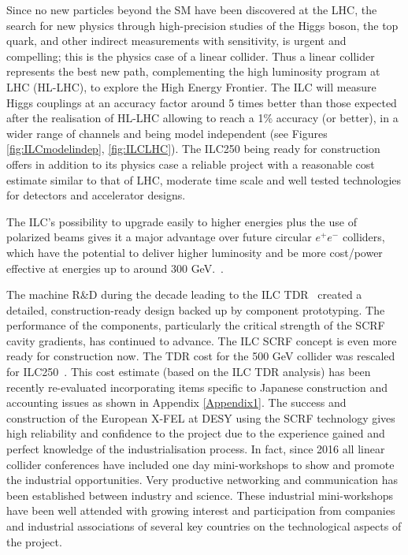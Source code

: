 \documentclass[%
 reprint,
 amsmath,amssymb,
 aps,
]{revtex4-1}
\newcommand{\todo}[1]{\textcolor{red}{{#1}}}
\def\ee{e^+e^-}
\begin{document}
Since no new particles beyond the SM have been discovered at the LHC, the search for new physics through high-precision studies of the Higgs boson, the top quark, and other indirect measurements with sensitivity, is urgent and compelling; this is the physics case of a linear collider. Thus a linear collider represents the best new path, complementing the high luminosity program at LHC (HL-LHC), to explore the High Energy Frontier. The ILC will measure Higgs couplings at an accuracy factor around 5 times better than those expected after the realisation of HL-LHC allowing to reach a 1\% accuracy (or better), in a wider range of channels and being model independent (see Figures \ref{fig:ILCmodelindep}, \ref{fig:ILCLHC}). The ILC250  being ready for construction offers in addition to its physics case a reliable project with a reasonable cost estimate similar to that of LHC, moderate time scale and well tested technologies for detectors and accelerator designs. 

The ILC’s possibility to upgrade easily to higher energies plus the use of polarized beams gives it a major advantage over future circular $\ee$ colliders, which have the potential to deliver higher luminosity and be more cost/power effective at energies up to around 300 GeV.~\cite{YWang2018}. 



The machine R\&D during the decade leading to the ILC TDR~\cite{Behnke:2013xla} created a detailed, construction-ready design backed up by
component prototyping. The performance of the components, particularly the critical strength of the SCRF cavity gradients,
has continued to advance.  The ILC SCRF concept is even more ready for construction now.  The TDR cost for the 500 GeV collider was rescaled for ILC250~\cite{Evans:2017rvt}. This cost estimate (based on the ILC TDR analysis) has been recently re-evaluated incorporating items specific to Japanese construction and accounting issues as shown in Appendix \ref{Appendix1}. The success and construction of the European X-FEL at DESY using the SCRF technology gives high reliability and confidence to the project due to the experience gained and perfect knowledge of the industrialisation process. In fact, since 2016 all linear collider conferences have included one day mini-workshops to show and promote the industrial opportunities. Very productive networking and communication has been established between industry and science. These industrial mini-workshops have been well attended with growing  interest and participation from companies and industrial associations of several key countries on the technological aspects of the project.  
\end{document}
